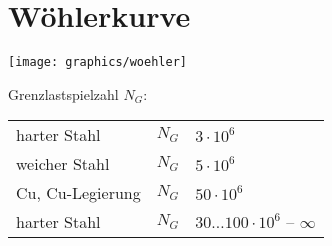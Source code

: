 \section{Wöhlerkurve} %
	\texttt{[image: graphics/woehler]}
	
	Grenzlastspielzahl $N_G$: \\
	\begin{tabular}{lr@{$\:\approx\:$}l}
		harter Stahl & $N_G$ & $3 \cdot 10^6$ \\
		weicher Stahl & $N_G$ & $5 \cdot 10^6$ \\
		Cu, Cu-Legierung & $N_G$ & $50 \cdot 10^6$ \\
		harter Stahl & $N_G$ & $30\dots 100 \cdot 10^6$ -- $\infty$ \\
	\end{tabular}
